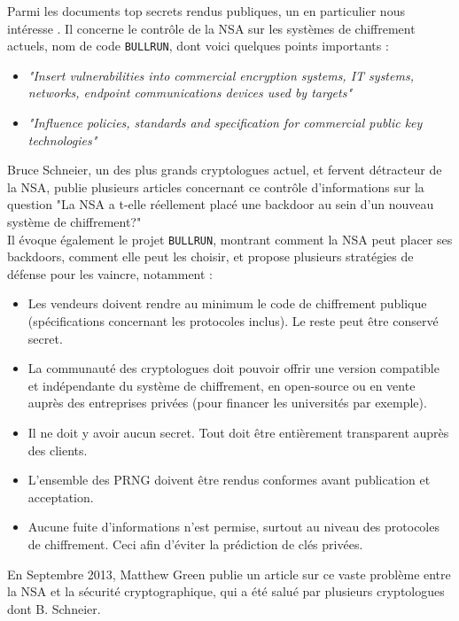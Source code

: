 	
	Parmi les documents top secrets rendus publiques, un en particulier
	nous intéresse \cite{topsecretNSA}. Il concerne le contrôle de la NSA 
	sur les systèmes de chiffrement actuels, nom de code \texttt{BULLRUN}, dont
	voici quelques points importants :\\
	\begin{itemize}
		\item \textit{"Insert vulnerabilities into commercial encryption systems, IT 
		systems, networks, endpoint communications devices used by targets"}
		\item \textit{"Influence policies, standards and specification for commercial 
		public key technologies"}\\
	\end{itemize}
	
	Bruce Schneier, un des plus grands cryptologues actuel,
	et fervent détracteur de la NSA, publie plusieurs articles concernant
	ce contrôle d'informations sur la question "La NSA a t-elle 
	réellement placé une backdoor au sein d'un nouveau système de 
	chiffrement?" \cite{schneier2007NSA} \\

	Il évoque également le projet \texttt{BULLRUN}, montrant comment la NSA
	peut placer ses backdoors, comment elle peut les choisir, 
	et propose plusieurs stratégies de défense \cite{schneier2013NSA}
	pour les vaincre, notamment : 
	\begin{itemize}
	\item Les vendeurs doivent rendre au minimum le code de chiffrement
	publique (spécifications concernant les protocoles inclus). Le reste
	peut être conservé secret.
	\item La communauté des cryptologues doit pouvoir offrir une version
	compatible et indépendante du système de chiffrement, en open-source
	ou en vente auprès des entreprises privées (pour financer les
	universités par exemple).
	\item Il ne doit y avoir aucun secret. Tout doit être entièrement transparent auprès des
	clients.
	\item L'ensemble des PRNG doivent être rendus conformes avant 
	publication et acceptation.
	\item Aucune fuite d'informations n'est permise, surtout au niveau
	des protocoles de chiffrement. Ceci afin d'éviter la prédiction de
	clés privées.\\
	\end{itemize}
	
	En Septembre 2013, Matthew Green publie un article \cite{green2013NSA}
	sur ce vaste problème entre la NSA et la sécurité cryptographique, qui
	a été salué par plusieurs cryptologues dont B. Schneier.\\
	
